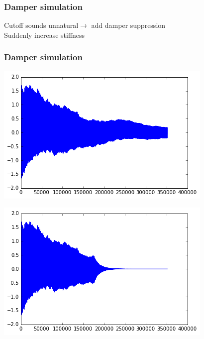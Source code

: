 \documentclass{beamer}
\begin{document}
\begin{frame}\frametitle{Damper simulation}
Cutoff sounds unnatural$\rightarrow$ add damper suppression\\
Suddenly increase stiffness
\end{frame}

\begin{frame}\frametitle{Damper simulation}

    \begin{minipage}{0.47\textwidth}
		\includegraphics[width=\textwidth]{images/normal.png}
	\end{minipage}
    \begin{minipage}{0.47\textwidth}
		\includegraphics[width=\textwidth]{images/damped.png}
	\end{minipage}
\end{frame}
\end{document}
